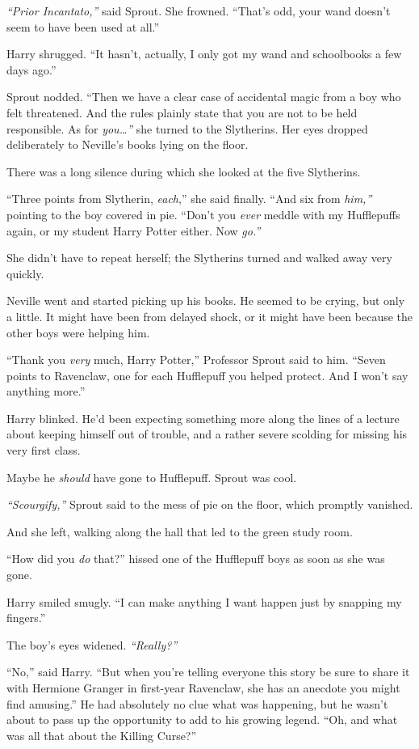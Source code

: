 \emph{``Prior Incantato,''} said Sprout. She frowned. ``That's odd, your
wand doesn't seem to have been used at all.''

Harry shrugged. ``It hasn't, actually, I only got my wand and
schoolbooks a few days ago.''

Sprout nodded. ``Then we have a clear case of accidental magic from a
boy who felt threatened. And the rules plainly state that you are not to
be held responsible. As for \emph{you\ldots{}''} she turned to the
Slytherins. Her eyes dropped deliberately to Neville's books lying on
the floor.

There was a long silence during which she looked at the five Slytherins.

``Three points from Slytherin, \emph{each},'' she said finally. ``And
six from \emph{him,''} pointing to the boy covered in pie. ``Don't you
\emph{ever} meddle with my Hufflepuffs again, or my student Harry Potter
either. Now \emph{go.''}

She didn't have to repeat herself; the Slytherins turned and walked away
very quickly.

Neville went and started picking up his books. He seemed to be crying,
but only a little. It might have been from delayed shock, or it might
have been because the other boys were helping him.

``Thank you \emph{very} much, Harry Potter,'' Professor Sprout said to
him. ``Seven points to Ravenclaw, one for each Hufflepuff you helped
protect. And I won't say anything more.''

Harry blinked. He'd been expecting something more along the lines of a
lecture about keeping himself out of trouble, and a rather severe
scolding for missing his very first class.

Maybe he \emph{should} have gone to Hufflepuff. Sprout was cool.

\emph{``Scourgify,''} Sprout said to the mess of pie on the floor, which
promptly vanished.

And she left, walking along the hall that led to the green study room.

``How did you \emph{do} that?'' hissed one of the Hufflepuff boys as
soon as she was gone.

Harry smiled smugly. ``I can make anything I want happen just by
snapping my fingers.''

The boy's eyes widened. \emph{``Really?''}

``No,'' said Harry. ``But when you're telling everyone this story be
sure to share it with Hermione Granger in first-year Ravenclaw, she has
an anecdote you might find amusing.'' He had absolutely no clue what was
happening, but he wasn't about to pass up the opportunity to add to his
growing legend. ``Oh, and what was all that about the Killing Curse?''

